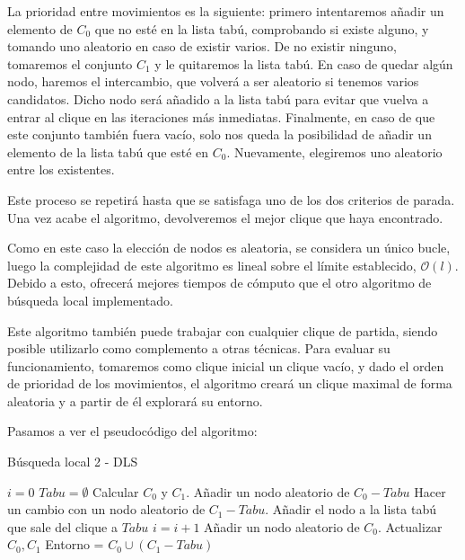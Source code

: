 La prioridad entre movimientos es la siguiente: primero intentaremos añadir un elemento de
$C_0$ que no esté en la lista tabú, comprobando si existe alguno, y tomando uno aleatorio
en caso de existir varios. De no existir ninguno, tomaremos el conjunto $C_1$ y le quitaremos
la lista tabú. En caso de quedar algún nodo, haremos el intercambio, que volverá a ser aleatorio
si tenemos varios candidatos. Dicho nodo será añadido a la lista tabú para evitar que vuelva
a entrar al clique en las iteraciones más inmediatas. Finalmente, en caso de que este conjunto
también fuera vacío, solo nos queda la posibilidad de añadir un elemento de la lista tabú que
esté en $C_0$. Nuevamente, elegiremos uno aleatorio entre los existentes.

Este proceso se repetirá hasta que se satisfaga uno de los dos criterios de parada. Una vez
acabe el algoritmo, devolveremos el mejor clique que haya encontrado.

Como en este caso la elección de nodos es aleatoria, se considera un único bucle,
luego la complejidad de este algoritmo es lineal sobre el límite establecido,
$\mathcal{O}(l)$. Debido a esto, ofrecerá mejores tiempos de cómputo que el otro
algoritmo de búsqueda local implementado.

Este algoritmo también puede trabajar con cualquier clique de partida, siendo posible
utilizarlo como complemento a otras técnicas. Para evaluar su funcionamiento, tomaremos
como clique inicial un clique vacío, y dado el orden de prioridad de los movimientos,
el algoritmo creará un clique maximal de forma aleatoria y a partir de él explorará
su entorno.

Pasamos a ver el pseudocódigo del algoritmo:

\begin{algorithm}[H]
\caption{Búsqueda local 2 - DLS}
  \begin{algorithmic}
    \State $i = 0$
    \State $Tabu = \emptyset$
    \State Calcular $C_0$ y $C_1$.
    \Repeat
        \State Añadir un nodo aleatorio de $C_0 - Tabu$
        \State Hacer un cambio con un nodo aleatorio de $C_1 - Tabu$.
        \State Añadir el nodo a la lista tabú que sale del clique a $Tabu$
        \State $i = i + 1$
        \State Añadir un nodo aleatorio de $C_0$.
      \EndIf
      \State Actualizar $C_0, C_1$
      \State Entorno = $C_0 \cup (C_1 - Tabu)$
  \end{algorithmic}
\end{algorithm}

